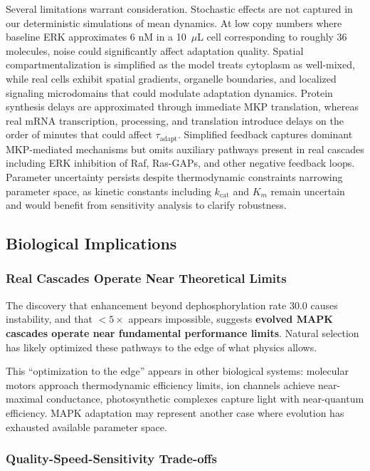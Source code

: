 \documentclass[twocolumn,11pt]{article}
\newcommand{\erk}{ERK}
\newcommand{\mkp}{MKP}
\newcommand{\mapk}{MAPK}
\newcommand{\srr}{\text{SRR}}
\begin{document}
Several limitations warrant consideration. Stochastic effects are not captured in our deterministic simulations of mean dynamics. At low copy numbers where baseline \erk{} approximates 6 nM in a 10~$\mu$L cell corresponding to roughly 36 molecules, noise could significantly affect adaptation quality. Spatial compartmentalization is simplified as the model treats cytoplasm as well-mixed, while real cells exhibit spatial gradients, organelle boundaries, and localized signaling microdomains that could modulate adaptation dynamics. Protein synthesis delays are approximated through immediate \mkp{} translation, whereas real mRNA transcription, processing, and translation introduce delays on the order of minutes that could affect $\tau_{\text{adapt}}$. Simplified feedback captures dominant \mkp{}-mediated mechanisms but omits auxiliary pathways present in real cascades including ERK inhibition of Raf, Ras-GAPs, and other negative feedback loops. Parameter uncertainty persists despite thermodynamic constraints narrowing parameter space, as kinetic constants including $k_{\text{cat}}$ and $K_m$ remain uncertain and would benefit from sensitivity analysis to clarify robustness.

\subsection{Biological Implications}

\subsubsection{Real Cascades Operate Near Theoretical Limits}

The discovery that enhancement beyond dephosphorylation rate 30.0 causes instability, and that \srr{} $<5\times$ appears impossible, suggests \textbf{evolved \mapk{} cascades operate near fundamental performance limits}. Natural selection has likely optimized these pathways to the edge of what physics allows.

This ``optimization to the edge'' appears in other biological systems: molecular motors approach thermodynamic efficiency limits, ion channels achieve near-maximal conductance, photosynthetic complexes capture light with near-quantum efficiency. \mapk{} adaptation may represent another case where evolution has exhausted available parameter space.

\subsubsection{Quality-Speed-Sensitivity Trade-offs}
\end{document}
